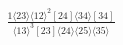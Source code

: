 \documentclass[varwidth, border=5pt]{standalone}
\begin{document}
\begin{my}
$\begin{gathered}
\scriptscriptstyle\frac{1⟨23⟩⟨12⟩^2[24]⟨34⟩[34]}{⟨13⟩^3[23]⟨24⟩⟨25⟩⟨35⟩}
\end{gathered}$
\end{my}
\end{document}

